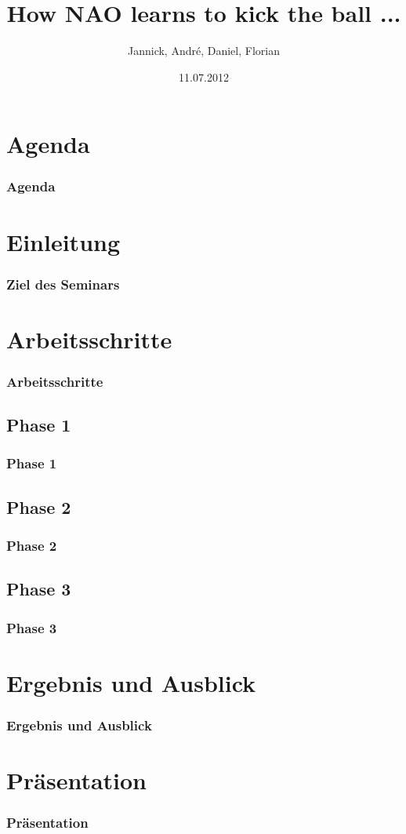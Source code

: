\documentclass[]{beamer}
\title{How NAO learns to kick the ball ...}
\author{Jannick, André, Daniel, Florian}
\date{11.07.2012}
\begin{document}
\begin{frame}
	\titlepage
\end{frame}

\section*{Agenda}
\begin{frame}
	\frametitle{Agenda}
  	\tableofcontents
\end{frame}

\section{Einleitung}
\begin{frame}
	\frametitle{Ziel des Seminars}
	
\end{frame}

\section{Arbeitsschritte}
\begin{frame}
	\frametitle{Arbeitsschritte}
	
\end{frame}

\subsection{Phase 1}
\begin{frame}
	\frametitle{Phase 1}
	
\end{frame}

\subsection{Phase 2}
\begin{frame}
	\frametitle{Phase 2}
	
\end{frame}

\subsection{Phase 3}
\begin{frame}
	\frametitle{Phase 3}
	
\end{frame}

\section{Ergebnis und Ausblick}
\begin{frame}
	\frametitle{Ergebnis und Ausblick}
	
\end{frame}

\section{Präsentation}	
\begin{frame}
	\frametitle{Präsentation}
	
\end{frame}
	
\end{document}

